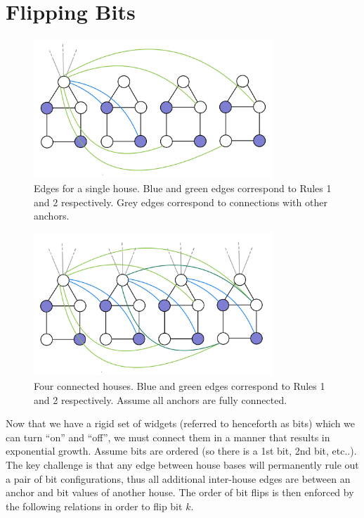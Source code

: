 \documentclass{article}
\begin{document}

\section{Flipping Bits}

\begin{figure}[ht]
\centering
\includegraphics[width=0.8\textwidth]{flipping-bits-v1.jpg}
\caption{\label{fig:flipping-bits-v1}Edges for a single house. Blue and green edges correspond to Rules 1 and 2 respectively. Grey edges correspond to connections with other anchors.}
\end{figure}

\begin{figure}[ht]
\centering
\includegraphics[width=0.8\textwidth]{flipping-bits-v2.jpg}
\caption{\label{fig:flipping-bits-v2}Four connected houses. Blue and green edges correspond to Rules 1 and 2 respectively. Assume all anchors are fully connected.}
\end{figure}

Now that we have a rigid set of widgets (referred to henceforth as bits) which we can turn ``on'' and ``off'', we must connect them in a manner that results in exponential growth. Assume bits are ordered (so there is a 1st bit, 2nd bit, etc..). The key challenge is that any edge between house bases will permanently rule out a pair of bit configurations, thus all additional inter-house edges are between an anchor and bit values of another house. The order of bit flips is then enforced by the following relations in order to flip bit $k$.
\end{document}

